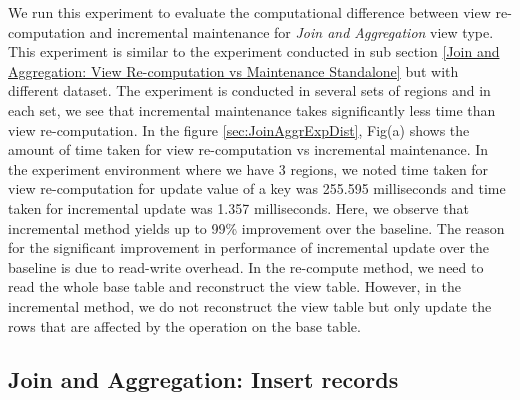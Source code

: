 \documentclass[11pt,a4paper,bibtotoc,idxtotoc,headsepline,footsepline,footexclude,BCOR12mm,DIV13]{scrbook}
\begin{document}
We run this experiment to evaluate the computational difference between view re-computation and incremental maintenance for \emph{Join and Aggregation} view type. This experiment is similar to the experiment conducted in sub section \ref{Join and Aggregation: View Re-computation vs Maintenance Standalone} but with different dataset. The experiment is conducted in several sets of regions and in each set, we see that incremental maintenance takes significantly less time than view re-computation. In the figure \ref{sec:JoinAggrExpDist}, Fig(a) shows the amount of time taken for view re-computation vs incremental maintenance. In the experiment environment where we have 3 regions, we noted time taken for view re-computation for update value of a key was 255.595 milliseconds and time taken for incremental update was 1.357 milliseconds. Here, we observe that incremental method yields up to 99\% improvement over the baseline. The reason for the significant improvement in performance of incremental update over the baseline is due to read-write overhead. In the re-compute method, we need to read the whole base table and reconstruct the view table. However, in the incremental method, we do not reconstruct the view table but only update the rows that are affected by the operation on the base table.



\subsection{Join and Aggregation: Insert records}
\label{Join and Aggregation: Insert Records Distributed}
\end{document}
